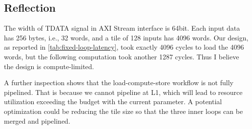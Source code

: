 \subsection{Reflection}

The width of TDATA signal in AXI Stream interface is 64bit.
Each input data has 256 bytes, i.e., 32 words, and a tile of 128 inputs has 4096 words.
Our design, as reported in \autoref{tab:fixed-loop-latency}, took exactly 4096 cycles to load the 4096 words, but the following computation took another 1287 cycles.
Thus I believe the design is compute-limited.

A further inspection shows that the load-compute-store workflow is not fully pipelined.
That is because we cannot pipeline at L1, which will lead to resource utilization exceeding the budget with the current parameter.
A potential optimization could be reducing the tile size so that the three inner loops can be merged and pipelined.